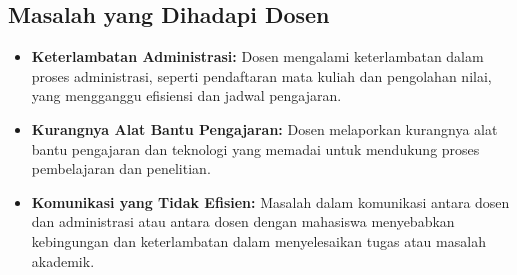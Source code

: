 \subsection{Masalah yang Dihadapi Dosen}
\begin{itemize}
	\item \textbf{Keterlambatan Administrasi:} Dosen mengalami keterlambatan dalam proses administrasi, seperti pendaftaran mata kuliah dan pengolahan nilai, yang mengganggu efisiensi dan jadwal pengajaran.
	\item \textbf{Kurangnya Alat Bantu Pengajaran:} Dosen melaporkan kurangnya alat bantu pengajaran dan teknologi yang memadai untuk mendukung proses pembelajaran dan penelitian.
	\item \textbf{Komunikasi yang Tidak Efisien:} Masalah dalam komunikasi antara dosen dan administrasi atau antara dosen dengan mahasiswa menyebabkan kebingungan dan keterlambatan dalam menyelesaikan tugas atau masalah akademik.
\end{itemize}



